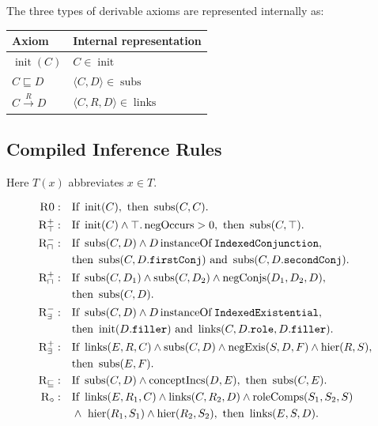 \documentclass[11pt]{article}
\newcommand{\sub}{\sqsubseteq}
\newcommand{\compose}{\circ}
\newcommand{\occursNeg}{\operatorname{negOccurs}}
\newcommand{\instOf}{\operatorname{instanceOf}}
\newcommand{\init}{\operatorname{init}}
\newcommand{\subs}{\operatorname{subs}}
\newcommand{\links}{\operatorname{links}}
\newcommand{\hier}{\operatorname{hier}}
\newcommand{\negConjs}{\operatorname{negConjs}}
\newcommand{\negExis}{\operatorname{negExis}}
\newcommand{\conceptIncs}{\operatorname{conceptIncs}}
\newcommand{\roleComps}{\operatorname{roleComps}}
\begin{document}
The three types of derivable axioms are represented internally as:

\begin{center}
\begin{tabular}{ll}
\toprule
\textbf{Axiom} & \textbf{Internal representation} \\
\midrule
$\init(C)$ & $C \in \init$ \\
$C \sub D$ & $\langle C,D\rangle \in \subs$ \\
$C \xrightarrow{R} D$ & $\langle C,R,D\rangle \in \links$ \\
\bottomrule
\end{tabular}
\end{center}

\subsection{Compiled Inference Rules}

Here $T(x)$ abbreviates $x \in T$.

\begin{align*}
\textsc{R0}:&\quad \text{If } \init(C), \text{ then } \subs(C,C).\\
\textsc{R}_{\top}^{+}:&\quad \text{If } \init(C) \land \top.\occursNeg > 0, \text{ then } \subs(C,\top).\\
\textsc{R}_{\sqcap}^{-}:&\quad \text{If } \subs(C,D) \land D \instOf \texttt{IndexedConjunction},\\
&\quad \text{then } \subs(C,D.\texttt{firstConj}) \text{ and } \subs(C,D.\texttt{secondConj}).\\
\textsc{R}_{\sqcap}^{+}:&\quad \text{If } \subs(C,D_1) \land \subs(C,D_2) \land \negConjs(D_1,D_2,D),\\
&\quad \text{then } \subs(C,D).\\
\textsc{R}_{\exists}^{-}:&\quad \text{If } \subs(C,D) \land D \instOf \texttt{IndexedExistential},\\
&\quad \text{then } \init(D.\texttt{filler}) \text{ and } \links(C,D.\texttt{role},D.\texttt{filler}).\\
\textsc{R}_{\exists}^{+}:&\quad \text{If } \links(E,R,C) \land \subs(C,D) \land \negExis(S,D,F) \land \hier(R,S),\\
&\quad \text{then } \subs(E,F).\\
\textsc{R}_{\sub}:&\quad \text{If } \subs(C,D) \land \conceptIncs(D,E), \text{ then } \subs(C,E).\\
\textsc{R}_{\compose}:&\quad \text{If } \links(E,R_1,C) \land \links(C,R_2,D) \land \roleComps(S_1,S_2,S)\\
&\quad \land\ \hier(R_1,S_1) \land \hier(R_2,S_2), \text{ then } \links(E,S,D).
\end{align*}
\end{document}
